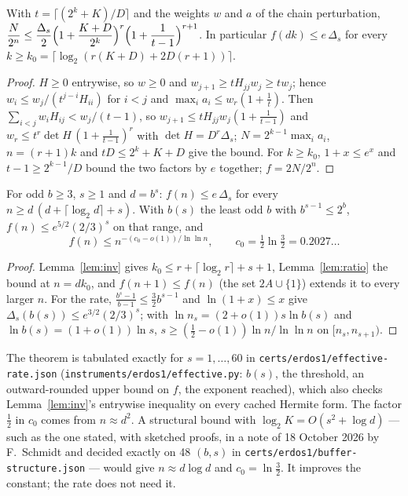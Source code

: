 \documentclass[11pt]{article}
\begin{document}
\begin{lemma}\label{lem:ratio}
With $t=\lceil(2^k+K)/D\rceil$ and the weights $w$ and $a$ of the chain perturbation,
$\displaystyle\frac{N}{2^n}\le\frac{\Delta_s}{2}\Bigl(1+\frac{K+D}{2^k}\Bigr)^{r}\Bigl(1+\frac1{t-1}\Bigr)^{r+1}$. In particular
$f(dk)\le e\,\Delta_s$ for every $k\ge k_0=\lceil\log_2(r(K+D)+2D(r+1))\rceil$.
\end{lemma}
\begin{proof}
$H\ge0$ entrywise, so $w\ge0$ and $w_{j+1}\ge tH_{jj}w_j\ge tw_j$; hence $w_i\le w_j/(t^{j-i}H_{ii})$ for $i<j$ and
$\max_ia_i\le w_r(1+\frac1t)$. Then $\sum_{i<j}w_iH_{ij}<w_j/(t-1)$, so $w_{j+1}\le tH_{jj}w_j(1+\frac1{t-1})$ and
$w_r\le t^r\det H\,(1+\frac1{t-1})^r$ with $\det H=D^r\Delta_s$; $N=2^{k-1}\max_ia_i$, $n=(r+1)k$ and $tD\le2^k+K+D$ give the
bound. For $k\ge k_0$, $1+x\le e^x$ and $t-1\ge2^{k-1}/D$ bound the two factors by $e$ together; $f=2N/2^n$.
\end{proof}

\begin{theorem}[effective]\label{thm:rate}
For odd $b\ge3$, $s\ge1$ and $d=b^s$: $f(n)\le e\,\Delta_s$ for every $n\ge d\,(d+\lceil\log_2d\rceil+s)$. With $b(s)$ the
least odd $b$ with $b^{s-1}\le2^b$, $f(n)\le e^{5/2}(2/3)^s$ on that range, and
\[ f(n)\le n^{-(c_0-o(1))/\ln\ln n},\qquad c_0=\tfrac12\ln\tfrac32=0.2027\ldots \]
\end{theorem}
\begin{proof}
Lemma~\ref{lem:inv} gives $k_0\le r+\lceil\log_2r\rceil+s+1$, Lemma~\ref{lem:ratio} the bound at $n=dk_0$, and $f(n+1)\le f(n)$
(the set $2A\cup\{1\}$) extends it to every larger $n$. For the rate, $\frac{b^s-1}{b-1}\le\frac32b^{s-1}$ and $\ln(1+x)\le x$
give $\Delta_s(b(s))\le e^{3/2}(2/3)^s$; with $\ln n_s=(2+o(1))s\ln b(s)$ and $\ln b(s)=(1+o(1))\ln s$, $s\ge(\frac12-o(1))\ln n/\ln\ln n$
on $[n_s,n_{s+1})$.
\end{proof}

The theorem is tabulated exactly for $s=1,\dots,60$ in \texttt{certs/erdos1/effective-rate.json}
(\texttt{instruments/erdos1/effective.py}: $b(s)$, the threshold, an outward-rounded upper bound on $f$, the exponent
reached), which also checks Lemma~\ref{lem:inv}'s entrywise inequality on every cached Hermite form. The factor $\frac12$ in
$c_0$ comes from $n\approx d^2$. A structural bound with $\log_2K=O(s^2+\log d)$ --- such as the one stated, with sketched
proofs, in a note of 18 October 2026 by F.~Schmidt and decided exactly on 48 $(b,s)$ in
\texttt{certs/erdos1/buffer-structure.json} --- would give $n\approx d\log d$ and $c_0=\ln\frac32$. It improves the constant;
the rate does not need it.
\end{document}
